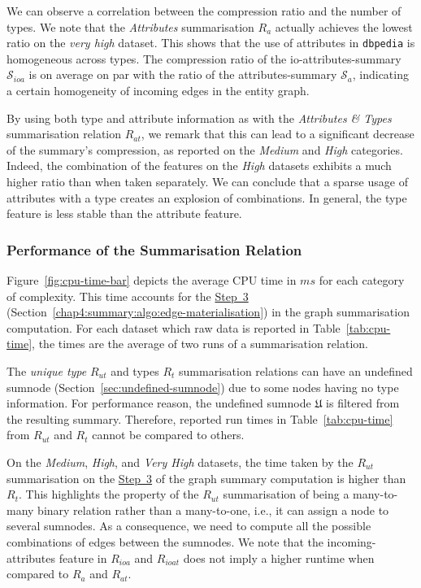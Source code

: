 We can observe a correlation between the compression ratio and the number of types.
We note that the \emph{Attributes} summarisation $R_a$ actually achieves the lowest ratio on the \emph{very high} dataset. This shows that the use of attributes in \texttt{dbpedia} is homogeneous across types. The compression ratio of the \gls{io-attributes-summary} $\mathcal{S}_{ioa}$ is on average on par with the ratio of the \gls{attributes-summary} $\mathcal{S}_a$, indicating a certain homogeneity of incoming edges in the entity graph.

By using both type and attribute information as with the \emph{Attributes \& Types} summarisation relation $R_{at}$, we remark that this can lead to a significant decrease of the summary's compression, as reported on the \emph{Medium} and \emph{High} categories.
Indeed, the combination of the features on the \emph{High} datasets exhibits a much higher ratio than when taken separately.%
We can conclude that a sparse usage of attributes with a type creates an explosion of combinations. In general, the type feature is less stable than the attribute feature.



\subsubsection{Performance of the Summarisation Relation}

Figure~\ref{fig:cpu-time-bar} depicts the average CPU time in $ms$ for each category of complexity. This time accounts for the \hyperref[step-he]{Step~3} (Section~\ref{chap4:summary:algo:edge-materialisation}) in the graph summarisation computation.
For each dataset which raw data is reported in Table~\ref{tab:cpu-time}, the times are the average of two runs of a summarisation relation.

The \emph{unique type} $R_{ut}$ and types $R_t$ summarisation relations can have an undefined sumnode (Section~\ref{sec:undefined-sumnode}) due to some nodes having no type information. For performance reason, the undefined sumnode $\mathfrak{U}$ is filtered from the resulting summary. Therefore, reported run times in Table~\ref{tab:cpu-time} from $R_{ut}$ and $R_t$ cannot be compared to others.

On the \emph{Medium}, \emph{High}, and \emph{Very High} datasets, the time taken by the $R_{ut}$ summarisation on the \hyperref[step-he]{Step~3} of the graph summary computation is higher than $R_t$. This highlights the property of the $R_{ut}$ summarisation of being a many-to-many binary relation rather than a many-to-one, i.e., it can assign a node to several sumnodes. As a consequence, we need to compute all the possible combinations of edges between the sumnodes.
We note that the \gls{incoming-attributes} feature in $R_{ioa}$ and $R_{ioat}$ does not imply a higher runtime when compared to $R_{a}$ and $R_{at}$.

